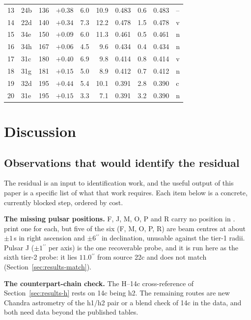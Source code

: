 \documentclass[11pt]{article}
\newcommand{\as}{\ensuremath{^{\prime\prime}}}
\begin{document}
\begin{table}[tbp]
\begin{tabular}{rlrrrrrrrl}
13 & 24b & 136 & $+0.38$ & 6.0 & 10.9 & 0.483 & 0.6 & 0.483 & -- \\
14 & 22d & 140 & $+0.34$ & 7.3 & 12.2 & 0.478 & 1.5 & 0.478 & v \\
15 & 34e & 150 & $+0.09$ & 6.0 & 11.3 & 0.461 & 0.5 & 0.461 & n \\
16 & 34h & 167 & $+0.06$ & 4.5 & 9.6 & 0.434 & 0.4 & 0.434 & n \\
17 & 31c & 180 & $+0.40$ & 6.9 & 9.8 & 0.414 & 0.8 & 0.414 & v \\
18 & 31g & 181 & $+0.15$ & 5.0 & 8.9 & 0.412 & 0.7 & 0.412 & n \\
19 & 32d & 195 & $+0.44$ & 5.4 & 10.1 & 0.391 & 2.8 & 0.390 & c \\
20 & 31e & 195 & $+0.15$ & 3.3 & 7.1 & 0.391 & 3.2 & 0.390 & n \\
\bottomrule
\end{tabular}
\end{table}

\section{Discussion}
\label{sec:discussion}

\subsection{Observations that would identify the residual}
\label{sec:disc-future}

The residual is an input to identification work, and the useful output of this paper is a specific list of what that work requires. Each item below is a concrete, currently blocked step, ordered by cost.

\textbf{The missing pulsar positions.} F, J, M, O, P and R carry no position in \citet{ColomiBernadich2026}. \citet{Chen2023} print one for each, but five of the six (F, M, O, P, R) are beam centres at about $\pm1$\,s in right ascension and $\pm6\as$ in declination, unusable against the tier-1 radii. Pulsar J ($\pm1\as$ per axis) is the one recoverable probe, and it is run here as the sixth tier-2 probe: it lies $11.0\as$ from source 22c and does not match (Section~\ref{sec:results-match}).

\textbf{The counterpart-chain check.} The H--14c cross-reference of Section~\ref{sec:results-h} rests on 14c being h2. The remaining routes are new Chandra astrometry of the h1/h2 pair or a blend check of 14c in the \citet{Henleywillis2018} data, and both need data beyond the published tables.
\end{document}
